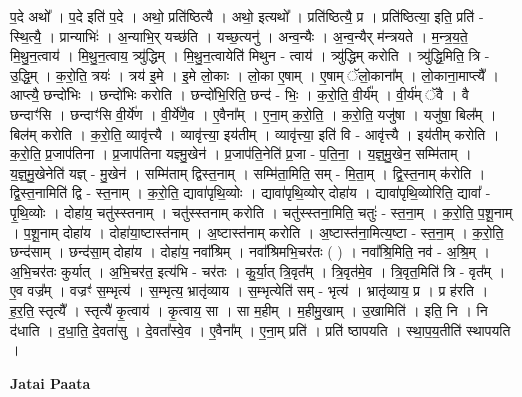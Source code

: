 \documentclass[17pt]{extarticle}
\begin{document}
प॒दे अथो᳚ । प॒दे इति॑ प॒दे । अथो॒ प्रति॑ष्ठित्यै । अथो॒ इत्यथो᳚ । प्रति॑ष्ठित्यै॒ प्र । प्रति॑ष्ठित्या॒ इति॒ प्रति॑ - स्थि॒त्यै॒ । प्रान्याभिः॑ । अ॒न्याभि॒र् यच्छ॑ति । यच्छ॒त्यनु॑ । अन्व॒न्यैः । अ॒न्व॒न्यैर् म॑न्त्रयते । म॒न्त्र॒य॒ते॒ मि॒थु॒न॒त्वाय॑ । मि॒थु॒न॒त्वाय॒ त्र्यु॑द्धिम् । मि॒थु॒न॒त्वायेति॑ मिथुन - त्वाय॑ । त्र्यु॑द्धिम् करोति । त्र्यु॑द्धि॒मिति॒ त्रि - उ॒द्धि॒म् । क॒रो॒ति॒ त्रयः॑ । त्रय॑ इ॒मे । इ॒मे लो॒काः । लो॒का ए॒षाम् । ए॒षाम् ॅलो॒काना᳚म् । लो॒काना॒माप्त्यै᳚ । आप्त्यै॒ छन्दो॑भिः । छन्दो॑भिः करोति । छन्दो॑भि॒रिति॒ छन्द॑ - भिः॒ । क॒रो॒ति॒ वी॒र्य᳚म् । वी॒र्य॑म् ॅवै । वै छन्दाꣳ॑सि । छन्दाꣳ॑सि वी॒र्ये॑ण । वी॒र्ये॑णै॒व । ए॒वैना᳚म् । ए॒ना॒म् क॒रो॒ति॒ । क॒रो॒ति॒ यजु॑षा । यजु॑षा॒ बिल᳚म् । बिल॑म् करोति । क॒रो॒ति॒ व्यावृ॑त्त्यै । व्यावृ॑त्त्या॒ इय॑तीम् । व्यावृ॑त्त्या॒ इति॑ वि - आवृ॑त्त्यै । इय॑तीम् करोति । क॒रो॒ति॒ प्र॒जाप॑तिना । प्र॒जाप॑तिना यज्ञ्मु॒खेन॑ । प्र॒जाप॑ति॒नेति॑ प्र॒जा - प॒ति॒ना॒ । य॒ज्ञ्॒मु॒खेन॒ सम्मि॑ताम् । य॒ज्ञ्॒मु॒खेनेति॑ यज्ञ् - मु॒खेन॑ । सम्मि॑ताम् द्विस्त॒नाम् । सम्मि॑ता॒मिति॒ सम् - मि॒ता॒म् । द्वि॒स्त॒नाम् क॑रोति । द्वि॒स्त॒नामिति॑ द्वि - स्त॒नाम् । क॒रो॒ति॒ द्यावा॑पृथि॒व्योः । द्यावा॑पृथि॒व्योर् दोहा॑य । द्यावा॑पृथि॒व्योरिति॒ द्यावा᳚ - पृ॒थि॒व्योः । दोहा॑य॒ चतु॑स्स्तनाम् । चतु॑स्स्तनाम् करोति । चतु॑स्स्तना॒मिति॒ चतुः॑ - स्त॒ना॒म् । क॒रो॒ति॒ प॒शू॒नाम् । प॒शू॒नाम् दोहा॑य । दोहा॑या॒ष्टास्त॑नाम् । अ॒ष्टास्त॑नाम् करोति । अ॒ष्टास्त॑ना॒मित्य॒ष्टा - स्त॒ना॒म् । क॒रो॒ति॒ छन्द॑साम् । छन्द॑सा॒म् दोहा॑य । दोहा॑य॒ नवा᳚श्रिम् । नवा᳚श्रिमभि॒चर॑तः ( ) । नवा᳚श्रि॒मिति॒ नव॑ - अ॒श्रि॒म् । अ॒भि॒चर॑तः कुर्यात् । अ॒भि॒चर॑त॒ इत्य॑भि - चर॑तः । कु॒र्या॒त् त्रि॒वृत᳚म् । त्रि॒वृत॑मे॒व । त्रि॒वृत॒मिति॑ त्रि - वृत᳚म् । ए॒व वज्र᳚म् । वज्रꣳ॑ स॒म्भृत्य॑ । स॒म्भृत्य॒ भ्रातृ॑व्याय । स॒म्भृत्येति॑ सम् - भृत्य॑ । भ्रातृ॑व्याय॒ प्र । प्र ह॑रति । ह॒र॒ति॒ स्तृत्यै᳚ । स्तृत्यै॑ कृ॒त्वाय॑ । कृ॒त्वाय॒ सा । सा म॒हीम् । म॒हीमु॒खाम् । उ॒खामिति॑ । इति॒ नि । नि द॑धाति । द॒धा॒ति॒ दे॒वता॑सु । दे॒वता᳚स्वे॒व । ए॒वैना᳚म् । ए॒ना॒म् प्रति॑ । प्रति॑ ष्ठापयति । स्था॒प॒य॒तीति॑ स्थापयति । \newline

\textbf{Jatai Paata} \newline
\end{document}
